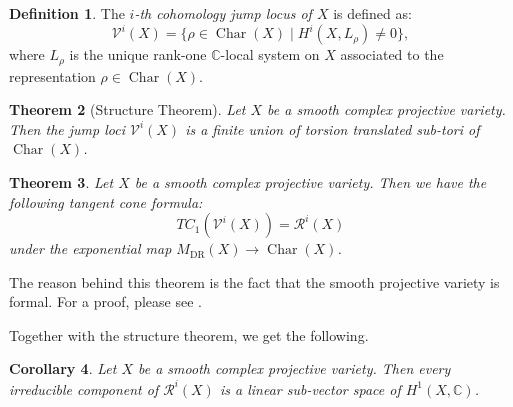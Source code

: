 \documentclass[a4paper,12pt,reqno]{amsart}
\newcommand{\C}{\mathbb{C}}
\newcommand{\Q}{\mathbb{Q}}
\newtheorem{theorem}{Theorem}[section]
\theoremstyle{plain}
\newtheorem{corollary}[theorem]{Corollary}
\theoremstyle{definition}
\newtheorem{definition}[theorem]{Definition}
\theoremstyle{remark}
\newtheorem{remark}[theorem]{Remark}
\def\bc{\begin{corollary}}
\def\ec{\end{corollary}}
\def\br{\begin{remark}}
\def\er{\end{remark}}
\def\bd{\begin{definition}}
\def\ed{\end{definition}}
\DeclareMathOperator{\Alb}{Alb}
\DeclareMathOperator{\Char}{Char}
\def\bC{\mathbb{C}}
\newcommand{\sR}{\mathcal{R}}
\newcommand\sV{{\mathcal V}}
\DeclareMathOperator{\DR}{DR}
\begin{document}
\bd The {\it $i$-th cohomology jump locus of $X$} is defined as: 
$${\sV^{i}(X)=\lbrace \rho\in \Char(X) \mid  H^{i}(X,L_{\rho})\neq 0 \rbrace},$$ 
where $L_{\rho}$ is the unique rank-one $\bC$-local system  on $X$ associated to the representation $\rho\in \Char(X) $.\ed


\begin{theorem}[Structure Theorem] Let $X$ be a smooth complex projective variety. Then the jump loci $\sV^i(X)$ is a finite union of torsion translated sub-tori of $\Char(X)$.
\end{theorem}




\begin{theorem} Let $X$ be a smooth complex projective variety.  Then we have the following tangent cone formula:
$$ TC_1( \sV^i(X)) = \sR^i(X)$$
under the exponential map $M_{\DR}(X) \to \Char(X)$. 
\end{theorem} 
The reason behind this theorem is the fact that the smooth projective variety is formal.  For a proof, please see \cite{S}.

Together with the structure theorem, we get the following. 

\bc Let $X$ be a smooth complex projective variety. Then every irreducible component of $\sR^i(X)$ is a linear sub-vector space of $H^1(X,\C)$.
\ec
\end{document}
